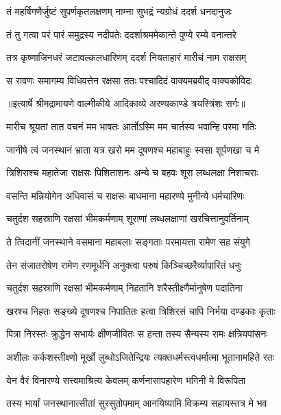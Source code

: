 \twolineshloka
{तं महर्षिगणैर्जुष्टं सुपर्णकृतलक्षणम्}
{नाम्ना सुभद्रं न्यग्रोधं ददर्श धनदानुजः} %

\twolineshloka
{तं तु गत्वा परं पारं समुद्रस्य नदीपतेः}
{ददर्शाश्रममेकान्ते पुण्ये रम्ये वनान्तरे} %

\twolineshloka
{तत्र कृष्णाजिनधरं जटावल्कलधारिणम्}
{ददर्श नियताहारं मारीचं नाम राक्षसम्} %

\twolineshloka
{स रावणः समागम्य विधिवत्तेन रक्षसा}
{ततः पश्चादिदं वाक्यमब्रवीद् वाक्यकोविदः} %


{॥इत्यार्षे श्रीमद्रामायणे वाल्मीकीये आदिकाव्ये अरण्यकाण्डे त्रयस्त्रिंशः सर्गः॥}


\twolineshloka
{मारीच श्रूयतां तात वचनं मम भाषतः}
{आर्तोऽस्मि मम चार्तस्य भवान्हि परमा गतिः} %

\twolineshloka
{जानीषे त्वं जनस्थानं भ्राता यत्र खरो मम}
{दूषणश्च महाबाहुः स्वसा शूर्पणखा च मे} %

\twolineshloka
{त्रिशिराश्च महातेजा राक्षसः पिशिताशनः}
{अन्ये च बहवः शूरा लब्धलक्षा निशाचराः} %

\twolineshloka
{वसन्ति मन्नियोगेन अधिवासं च राक्षसः}
{बाधमाना महारण्ये मुनीन्ये धर्मचारिणः} %

\twolineshloka
{चतुर्दश सहस्राणि रक्षसां भीमकर्मणाम्}
{शूराणां लब्धलक्षाणां खरचित्तानुवर्तिनाम्} %

\twolineshloka
{ते त्विदानीं जनस्थाने वसमाना महाबलाः}
{सङ्गताः परमायत्ता रामेण सह संयुगे} %

\twolineshloka
{तेन संजातरोषेण रामेण रणमूर्धनि}
{अनुक्त्वा परुषं किञ्चिच्छरैर्व्यापारितं धनुः} %

\twolineshloka
{चतुर्दश सहस्राणि रक्षसां भीमकर्मणाम्}
{निहतानि शरैस्तीक्ष्णैर्मानुषेण पदातिना} %

\twolineshloka
{खरश्च निहतः सङ्ख्ये दूषणश्च निपातितः}
{हत्वा त्रिशिरसं चापि निर्भया दण्डकाः कृताः} %

\twolineshloka
{पित्रा निरस्तः क्रुद्धेन सभार्यः क्षीणजीवितः}
{स हन्ता तस्य सैन्यस्य रामः क्षत्रियपांसनः} %

\twolineshloka
{अशीलः कर्कशस्तीक्ष्णो मूर्खो लुब्धोऽजितेन्द्रियः}
{त्यक्तधर्मस्त्वधर्मात्मा भूतानामहिते रतः} %

\twolineshloka
{येन वैरं विनारण्ये सत्त्वमाश्रित्य केवलम्}
{कर्णनासापहारेण भगिनी मे विरूपिता} %

\twolineshloka
{तस्य भार्यां जनस्थानात्सीतां सुरसुतोपमाम्}
{आनयिष्यामि विक्रम्य सहायस्तत्र मे भव} %

